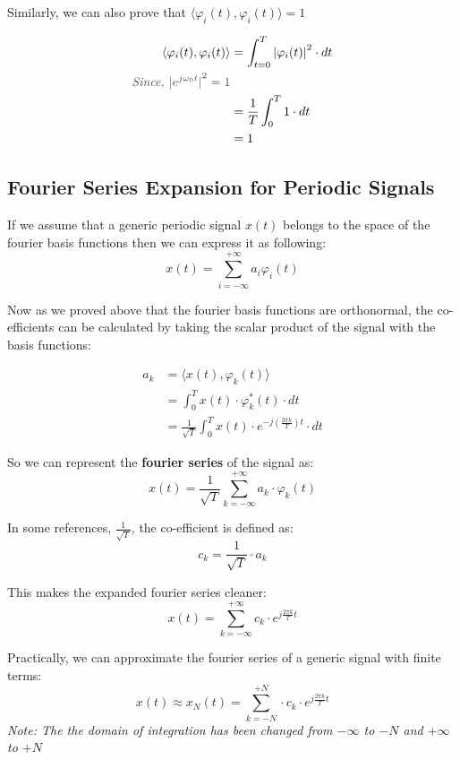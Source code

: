 \documentclass[letterpaper,12pt]{article}
\newcommand{\annot}[1]{\textcolor{darkgray}{\textit{#1}}}
\begin{document}
Similarly, we can also prove that $\langle \varphi_{i}(t), \varphi_{i}(t)
    \rangle = 1$

\begin{align*}
    \langle \varphi_{i}(t), \varphi_{i}(t) \rangle & = \int_{t=0}^{T} {|\varphi_{i}(t)|}^{2}\cdot dt \\
    \annot{Since, ${|e^{j\omega_{0}t}|}^2 = 1$}    &                                                 \\
                                                   & = \frac{1}{T} \int_{0}^{T} 1 \cdot dt           \\
                                                   & = 1
\end{align*}

\subsection{Fourier Series Expansion for Periodic Signals}
If we assume that a generic periodic signal $x(t)$ belongs to the space of the
fourier basis functions then we can express it as following:
\[x(t) = \sum_{i=-\infty}^{+\infty}a_{i}\varphi_{i}(t)\]

Now as we proved above that the fourier basis functions are orthonormal, the
co-efficients can be calculated by taking the scalar product of the signal with
the basis functions:

\begin{align*}
    a_{k} & = \langle x(t), \varphi_{k}(t) \rangle                                        \\
          & =\int_{0}^{T}x (t)\cdot\varphi_{k}^{*} (t)\cdot dt                            \\
          & =\frac{1}{\sqrt{T}}\int_{0}^{T} x(t) \cdot e^{-j (\frac{2\pi k}{T})t}\cdot dt
\end{align*}

So we can represent the \textbf{fourier series} of the signal as:
\[x(t) = \frac{1}{\sqrt{T}}\sum_{k=-\infty}^{+\infty} a_{k} \cdot \varphi_{k}(t)\]

In some references, $\frac{1}{\sqrt{T}}$, the co-efficient is defined as:
\[c_{k} = \frac{1}{\sqrt{T}}\cdot a_{k}\]

This makes the expanded fourier series cleaner:
\[x(t) = \sum_{k=-\infty}^{+\infty} c_{k} \cdot e^{j\frac{2\pi k}{T}t}\]

Practically, we can approximate the fourier series of a generic signal with
finite terms:
\[x(t) \approx x_{N}(t) = \sum_{k=-N}^{+N}\cdot c_{k} \cdot e^{j\frac{2\pi k}{T}t}\]
\textit{Note: The the domain of integration has been changed from $-\infty$ to $-N$ and $+\infty$ to $+N$}
\end{document}
